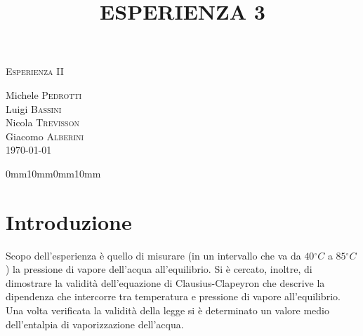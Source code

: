 \documentclass[11pt]{article}
\begin{document}
\begin{center}



\textsc{\Huge Esperienza II}\\[0.5cm]



\large
\title{ESPERIENZA 3}

Michele \textsc{Pedrotti}\\
Luigi \textsc{Bassini}\\
Nicola \textsc{Trevisson}\\
Giacomo \textsc{Alberini}
\\
\vspace{10pt}
\today





\end{center}

\setmarginsrb{30mm}{10mm}{25mm}{10mm}%
             {0mm}{10mm}{0mm}{10mm}


\section{Introduzione}
Scopo dell'esperienza è quello di misurare (in un intervallo che va da $40\ensuremath{^\circ}C$ a $85\ensuremath{^\circ}C$) la pressione di vapore dell'acqua all'equilibrio. Si è cercato, inoltre, di dimostrare la validità dell'equazione di Clausius-Clapeyron che descrive la dipendenza che intercorre tra temperatura e pressione di vapore all'equilibrio.
Una volta verificata la validità della legge si è determinato un valore medio dell'entalpia di vaporizzazione dell'acqua.
\end{document}
